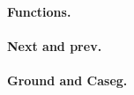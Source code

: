 \begin{abstrsyn}
\paragraph{Functions.}
\paragraph{Next and prev.}
\paragraph{Ground and Caseg.}






\end{abstrsyn}

